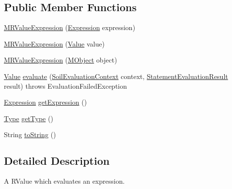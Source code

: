 \subsection*{Public Member Functions}
\begin{DoxyCompactItemize}
\item 
\hyperlink{classorg_1_1tzi_1_1use_1_1uml_1_1sys_1_1soil_1_1_m_r_value_expression_a396863ad230a62e236f89fcdf3df59fa}{M\-R\-Value\-Expression} (\hyperlink{classorg_1_1tzi_1_1use_1_1uml_1_1ocl_1_1expr_1_1_expression}{Expression} expression)
\item 
\hyperlink{classorg_1_1tzi_1_1use_1_1uml_1_1sys_1_1soil_1_1_m_r_value_expression_a2814baa4348b05f0b652f11a5d33874c}{M\-R\-Value\-Expression} (\hyperlink{classorg_1_1tzi_1_1use_1_1uml_1_1ocl_1_1value_1_1_value}{Value} value)
\item 
\hyperlink{classorg_1_1tzi_1_1use_1_1uml_1_1sys_1_1soil_1_1_m_r_value_expression_af071dde2ab48f36f305dda7396834786}{M\-R\-Value\-Expression} (\hyperlink{interfaceorg_1_1tzi_1_1use_1_1uml_1_1sys_1_1_m_object}{M\-Object} object)
\item 
\hyperlink{classorg_1_1tzi_1_1use_1_1uml_1_1ocl_1_1value_1_1_value}{Value} \hyperlink{classorg_1_1tzi_1_1use_1_1uml_1_1sys_1_1soil_1_1_m_r_value_expression_a23593c9294504ed0f0eed55fbf385f28}{evaluate} (\hyperlink{classorg_1_1tzi_1_1use_1_1uml_1_1sys_1_1soil_1_1_soil_evaluation_context}{Soil\-Evaluation\-Context} context, \hyperlink{classorg_1_1tzi_1_1use_1_1uml_1_1sys_1_1_statement_evaluation_result}{Statement\-Evaluation\-Result} result)  throws Evaluation\-Failed\-Exception 
\item 
\hyperlink{classorg_1_1tzi_1_1use_1_1uml_1_1ocl_1_1expr_1_1_expression}{Expression} \hyperlink{classorg_1_1tzi_1_1use_1_1uml_1_1sys_1_1soil_1_1_m_r_value_expression_af7a9992dc9f42eb99b96c7243fb0a293}{get\-Expression} ()
\item 
\hyperlink{interfaceorg_1_1tzi_1_1use_1_1uml_1_1ocl_1_1type_1_1_type}{Type} \hyperlink{classorg_1_1tzi_1_1use_1_1uml_1_1sys_1_1soil_1_1_m_r_value_expression_a2bf3df8ba50208a9f3f662177b768541}{get\-Type} ()
\item 
String \hyperlink{classorg_1_1tzi_1_1use_1_1uml_1_1sys_1_1soil_1_1_m_r_value_expression_a16c4b28b177ca7089e1d8b3badf03cf2}{to\-String} ()
\end{DoxyCompactItemize}


\subsection{Detailed Description}
A R\-Value which evaluates an expression.

